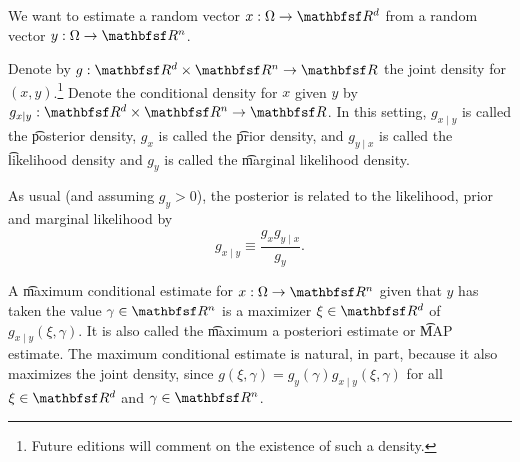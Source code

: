 

We want to estimate a random vector $x: \Omega \to \R^d$ from a random vector $y: \Omega \to \R^n$.


Denote by $g: \R^d \times \R^n \to \R$ the joint density for $(x, y)$.\footnote{Future editions will comment on the existence of such a density.}
Denote the conditional density for $x$ given $y$ by $g_{x \mid y}: \R^d \times \R^n \to \R$.
In this setting, $g_{x \mid y}$ is called the \t{posterior density}, $g_{x}$ is called the \t{prior density}, and $g_{y \mid x}$ is called the \t{likelihood density} and $g_{y}$ is called the \t{marginal likelihood density}.

As usual (and assuming $g_{y} > 0$), the posterior is related to the likelihood, prior and marginal likelihood by
\[
  g_{x \mid y} \equiv \frac{g_x g_{y \mid x}}{g_{y}}.
\]

A \t{maximum conditional estimate} for $x: \Omega \to \R^n$ given that $y$ has taken the value $\gamma \in \R^n$ is a maximizer $\xi \in \R^d$ of $g_{x \mid y}(\xi, \gamma)$.
It is also called the \t{maximum a posteriori estimate} or \t{MAP estimate}.
The maximum conditional estimate is natural, in part, because it also maximizes the joint density, since $g(\xi, \gamma) = g_y(\gamma) g_{x \mid y}(\xi, \gamma)$ for all $\xi \in \R^d$ and $\gamma \in \R^n$.

\blankpage
